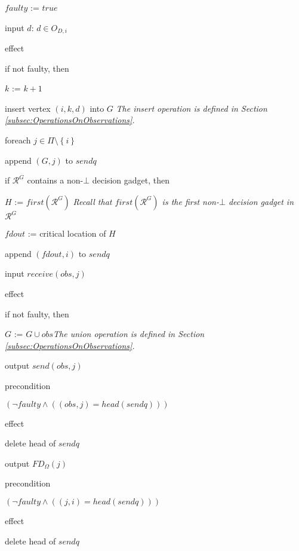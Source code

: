 \documentclass[11pt]{article}
\numberwithin{theorem}{section}
\newcommand{\tab}{\hspace{5mm}}
\newcommand{\set}[1]{\left\{#1\right\}}
\begin{document}
\begin{algorithm}
\tab \tab $faulty$ := $true$

\tab


\tab input $d$: $d \in O_{D,i}$

\tab effect

\tab \tab if not faulty, then

\tab \tab \tab $k$ :=  $k+1$



\tab \tab \tab insert vertex $(i,k,d)$ into $G$ \hfill \emph{The insert operation is defined in Section \ref{subsec:OperationsOnObservations}.}

\tab \tab \tab foreach $j \in \Pi \setminus \set{i}$

\tab \tab \tab \tab append $(G,j)$ to $sendq$

\tab \tab \tab if $\mathcal{R}^G$ contains a non-$\bot$ decision gadget, then

\tab \tab \tab \tab $H$ := $first(\mathcal{R}^G)$ \hfill \emph{Recall that $first(\mathcal{R}^G)$ is the first non-$\bot$ decision gadget in $\mathcal{R}^G$}



\tab \tab \tab \tab $fdout$ := critical location of $H$

\tab \tab \tab append $(fdout, i)$ to $sendq$


\tab

\tab input $receive(obs, j)$

\tab effect

\tab \tab if not faulty, then

\tab \tab \tab $G$ := $G \cup obs$\hfill \emph{The union operation is defined in Section \ref{subsec:OperationsOnObservations}.}


\tab

\tab output $send(obs,j)$

\tab precondition

\tab \tab $(\neg faulty \wedge ((obs,j) = head(sendq))) $

\tab effect

\tab \tab delete head of $sendq$



\tab

\tab output $FD_\Omega(j)$

\tab precondition

\tab \tab $(\neg faulty \wedge ((j,i) = head(sendq)))$ 

\tab effect

\tab \tab delete head of $sendq$

\end{algorithm}
\end{document}
